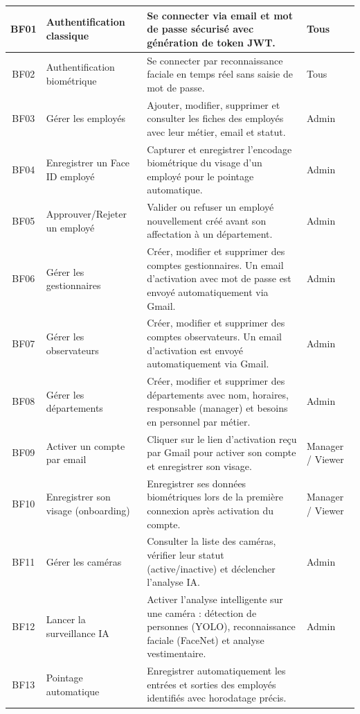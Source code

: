 \begin{longtable}{|c|>{\raggedright\arraybackslash}p{5cm}|>{\raggedright\arraybackslash}p{6cm}|l|}
  BF01 & Authentification classique &
    Se connecter via email et mot de passe sécurisé avec génération de token JWT. &
    Tous \\
  \hline
  BF02 & Authentification biométrique &
    Se connecter par reconnaissance faciale en temps réel sans saisie de mot de passe. &
    Tous \\
  \hline
  BF03 & Gérer les employés &
    Ajouter, modifier, supprimer et consulter les fiches des employés avec leur métier, email et statut. &
    Admin \\
  \hline
  BF04 & Enregistrer un Face ID employé &
    Capturer et enregistrer l'encodage biométrique du visage d'un employé pour le pointage automatique. &
    Admin \\
  \hline
  BF05 & Approuver/Rejeter un employé &
    Valider ou refuser un employé nouvellement créé avant son affectation à un département. &
    Admin \\
  \hline
  BF06 & Gérer les gestionnaires &
    Créer, modifier et supprimer des comptes gestionnaires. Un email d'activation avec mot de passe est envoyé automatiquement via Gmail. &
    Admin \\
  \hline
  BF07 & Gérer les observateurs &
    Créer, modifier et supprimer des comptes observateurs. Un email d'activation est envoyé automatiquement via Gmail. &
    Admin \\
  \hline
  BF08 & Gérer les départements &
    Créer, modifier et supprimer des départements avec nom, horaires, responsable (manager) et besoins en personnel par métier. &
    Admin \\
  \hline
  BF09 & Activer un compte par email &
    Cliquer sur le lien d'activation reçu par Gmail pour activer son compte et enregistrer son visage. &
    Manager / Viewer \\
  \hline
  BF10 & Enregistrer son visage (onboarding) &
    Enregistrer ses données biométriques lors de la première connexion après activation du compte. &
    Manager / Viewer \\
  \hline
  BF11 & Gérer les caméras &
    Consulter la liste des caméras, vérifier leur statut (active/inactive) et déclencher l'analyse IA. &
    Admin \\
  \hline
  BF12 & Lancer la surveillance IA &
    Activer l'analyse intelligente sur une caméra : détection de personnes (YOLO), reconnaissance faciale (FaceNet) et analyse vestimentaire. &
    Admin \\
  \hline
  BF13 & Pointage automatique &
    Enregistrer automatiquement les entrées et sorties des employés identifiés avec horodatage précis. &

\end{longtable}
